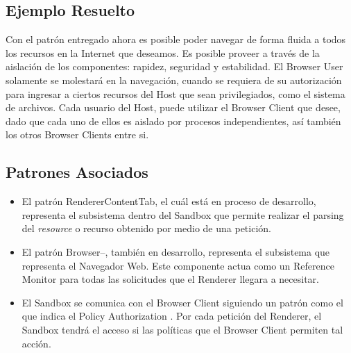 \subsection{Ejemplo Resuelto}
Con el patrón entregado ahora es posible poder navegar de forma fluida a todos los recursos en la Internet que deseamos. Es posible proveer a través de la aislación de los componentes: rapidez, seguridad y estabilidad. El Browser User solamente se molestará en la navegación, cuando se requiera de su autorización para ingresar a ciertos recursos del Host que sean privilegiados, como el sistema de archivos. Cada usuario del Host, puede utilizar el Browser Client que desee, dado que cada uno de ellos es aislado por procesos independientes, así también los otros Browser Clients entre si.


\subsection{Patrones Asociados}
\begin{itemize}
	\item El patrón RendererContentTab, el cuál está en proceso de desarrollo, representa el subsistema dentro del Sandbox que permite realizar el parsing del \textit{resource} o recurso obtenido por medio de una petición.
	\item El patrón Browser--, también en desarrollo, representa el subsistema que representa el Navegador Web. Este componente actua como un Reference Monitor \cite{fernandez2013security} para todas las solicitudes que el Renderer llegara a necesitar.
	\item El Sandbox se comunica con el Browser Client siguiendo un patrón como el que indica el Policy Authorization \cite{fernandez2013security}. Por cada petición del Renderer, el Sandbox tendrá el acceso si las políticas que el Browser Client permiten tal acción.
\end{itemize}

